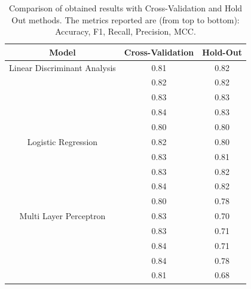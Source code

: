             \begin{table}[htbp]
                \centering
                \begin{tabular}{|c|c|c|}
                \hline
                \textbf{Model} & \textbf{Cross-Validation} & \textbf{Hold-Out} \\ \hline
                    Linear Discriminant Analysis    & 0.81 & 0.82 \\ 
                                                    & 0.82 & 0.82 \\ 
                                                    & 0.83 & 0.83 \\ 
                                                    & 0.84 & 0.83 \\
                                                    & 0.80 & 0.80 \\ 
                                                    \hline
                    Logistic Regression             & 0.82 & 0.80 \\ 
                                                    & 0.83 & 0.81 \\ 
                                                    & 0.83 & 0.82 \\ 
                                                    & 0.84 & 0.82 \\
                                                    & 0.80 & 0.78 \\
                                                    \hline
                    Multi Layer Perceptron          & 0.83 & 0.70 \\ 
                                                    & 0.83 & 0.71 \\ 
                                                    & 0.84 & 0.71 \\
                                                    & 0.84 & 0.78 \\ 
                                                    & 0.81 & 0.68 \\ 
                                                    \hline
                \end{tabular}
                \caption{Comparison of obtained results with Cross-Validation and Hold Out methods. The metrics reported are (from top to bottom): Accuracy, F1, Recall, Precision, MCC.}
                \label{tab:feature_engineering_approach_holdout}
            \end{table}

            \newpage

